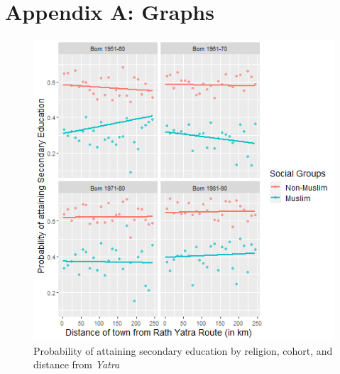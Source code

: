 \documentclass{article}
\begin{document}
\newpage

\appendix
\section*{Appendix A: Graphs}\label{appendix_a}
\renewcommand\thefigure{A.\arabic{figure}}

\setcounter{figure}{0}
\begin{figure}[H]
    \centering
    \includegraphics[scale = 0.7]{images/graph_li_sec_mus.png}
    \caption{Probability of attaining secondary education by religion, cohort, and distance from \textit{Yatra}}
    \label{fig:li_sec_mus} 
\end{figure}
\end{document}
